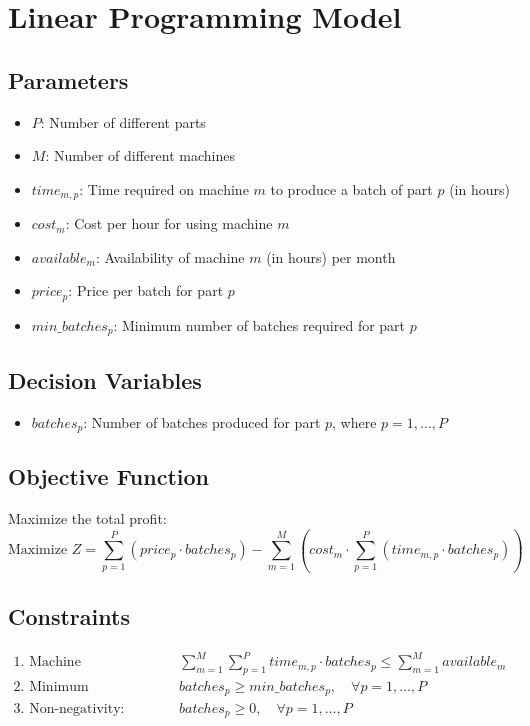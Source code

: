 \documentclass{article}
\begin{document}
\section*{Linear Programming Model}

\subsection*{Parameters}
\begin{itemize}
    \item $P$: Number of different parts
    \item $M$: Number of different machines
    \item $time_{m,p}$: Time required on machine $m$ to produce a batch of part $p$ (in hours)
    \item $cost_{m}$: Cost per hour for using machine $m$
    \item $available_{m}$: Availability of machine $m$ (in hours) per month
    \item $price_{p}$: Price per batch for part $p$
    \item $min\_batches_{p}$: Minimum number of batches required for part $p$
\end{itemize}

\subsection*{Decision Variables}
\begin{itemize}
    \item $batches_{p}$: Number of batches produced for part $p$, where $p = 1, \ldots, P$
\end{itemize}

\subsection*{Objective Function}
Maximize the total profit:
\[
\text{Maximize } Z = \sum_{p=1}^{P} (price_{p} \cdot batches_{p}) - \sum_{m=1}^{M} \left( cost_{m} \cdot \sum_{p=1}^{P} (time_{m,p} \cdot batches_{p}) \right)
\]

\subsection*{Constraints}
\begin{align*}
\text{1. Machine availability:} & \quad \sum_{m=1}^{M} \sum_{p=1}^{P} time_{m,p} \cdot batches_{p} \leq \sum_{m=1}^{M} available_{m} \\
\text{2. Minimum production requirements:} & \quad batches_{p} \geq min\_batches_{p}, \quad \forall p = 1, \ldots, P \\
\text{3. Non-negativity:} & \quad batches_{p} \geq 0, \quad \forall p = 1, \ldots, P \\
\end{align*}
\end{document}
